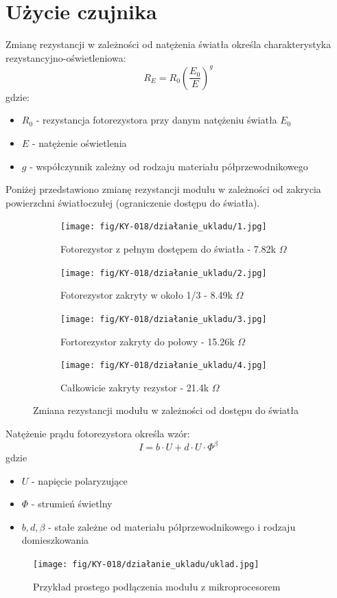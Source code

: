\documentclass[11pt, a4paper]{article}
\begin{document}
\section*{Użycie czujnika}
Zmianę rezystancji w zależności od natężenia światła określa charakterystyka rezystancyjno-oświetleniowa:
$$R_{E}=R_{0}(\frac{E_{0}}{E})^g$$
gdzie:
\begin{itemize}
    \item $R_{0}$ - rezystancja fotorezystora przy danym natężeniu światła $E_0$
    \item $E$ - natężenie oświetlenia
    \item $g$ - współczynnik zależny od rodzaju materiału półprzewodnikowego
\end{itemize}
Poniżej przedstawiono zmianę rezystancji modułu w zależności od zakrycia powierzchni światłoczułej (ograniczenie dostępu do światła).
\begin{figure}[h!]
\centering
\begin{subfigure}{.5\textwidth}
  \centering
  \texttt{[image: fig/KY-018/działanie\_ukladu/1.jpg]}
  \caption{Fotorezystor z pełnym dostępem do światła - 7.82k $\Omega$}
  \label{fig:sub1}
\end{subfigure}%
\begin{subfigure}{.5\textwidth}
  \centering
  \texttt{[image: fig/KY-018/działanie\_ukladu/2.jpg]}
  \caption{Fotorezystor zakryty w około 1/3 - 8.49k $\Omega$}
  \label{fig:sub2}
\end{subfigure}
\label{fig:test}
\begin{subfigure}{.5\textwidth}
  \centering
  \texttt{[image: fig/KY-018/działanie\_ukladu/3.jpg]}
  \caption{Fortorezystor zakryty do połowy - 15.26k $\Omega$}
  \label{fig:sub3}
\end{subfigure}%
\begin{subfigure}{.5\textwidth}
  \centering
  \texttt{[image: fig/KY-018/działanie\_ukladu/4.jpg]}
  \caption{Całkowicie zakryty rezystor - 21.4k $\Omega$}
  \label{fig:sub4}
\end{subfigure}
\caption{Zmiana rezystancji modułu w zależności od dostępu do światła}
\label{fig:test}
\end{figure}
\newpage
Natężenie prądu fotorezystora określa wzór:
$$I=b\cdot U+d\cdot U\cdot \Phi^{\beta} $$
gdzie
\begin{itemize}
    \item $U$ - napięcie polaryzujące
    \item $\Phi$ - strumień świetlny
    \item $b, d, \beta$ - stałe zależne od materiału półprzewodnikowego i rodzaju domieszkowania
\end{itemize}
\vspace{0.5cm}
\begin{figure}[h!]
    \centering
    \texttt{[image: fig/KY-018/działanie\_ukladu/uklad.jpg]}
    \caption{Przykład prostego podłączenia modułu z mikroprocesorem}
    \label{fig:my_label}
\end{figure}
\end{document}
